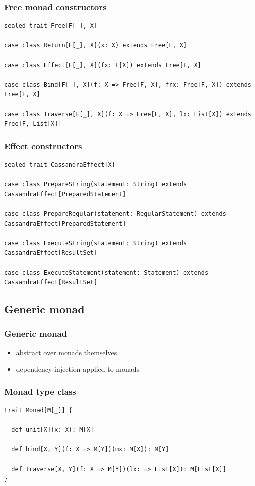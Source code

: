\documentclass{beamer}
\begin{document}
\begin{frame}[fragile]
\frametitle{Free monad constructors}
\begin{lstlisting}
sealed trait Free[F[_], X]

case class Return[F[_], X](x: X) extends Free[F, X]

case class Effect[F[_], X](fx: F[X]) extends Free[F, X]

case class Bind[F[_], X](f: X => Free[F, X], frx: Free[F, X]) extends Free[F, X]

case class Traverse[F[_], X](f: X => Free[F, X], lx: List[X]) extends Free[F, List[X]]
\end{lstlisting}
\end{frame}

\begin{frame}[fragile]
\frametitle{Effect constructors}
\begin{lstlisting}
sealed trait CassandraEffect[X]

case class PrepareString(statement: String) extends CassandraEffect[PreparedStatement]

case class PrepareRegular(statement: RegularStatement) extends CassandraEffect[PreparedStatement]

case class ExecuteString(statement: String) extends CassandraEffect[ResultSet]

case class ExecuteStatement(statement: Statement) extends CassandraEffect[ResultSet]
\end{lstlisting}
\end{frame}

\subsection{Generic monad}
\begin{frame}
\frametitle{Generic monad}
\begin{itemize}
\item abstract over monads themselves
\item dependency injection applied to monads
\end{itemize}
\end{frame}

\begin{frame}[fragile]
\frametitle{Monad type class}
\begin{lstlisting}
trait Monad[M[_]] {

  def unit[X](x: X): M[X]

  def bind[X, Y](f: X => M[Y])(mx: M[X]): M[Y]
  
  def traverse[X, Y](f: X => M[Y])(lx: => List[X]): M[List[X]]
}
\end{lstlisting}
\end{frame}
\end{document}
